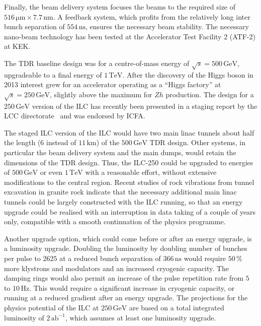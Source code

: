 \documentclass[%
 reprint,
 amsmath,amssymb,
 aps,
]{revtex4-1}
\begin{document}
Finally, the beam delivery system focuses the beams to the required size of $516\,{\mathrm{\mu m}} \times 7.7\,{\mathrm{nm}} $. 
A feedback system, which profits from the relatively long inter bunch separation of $554\,{\mathrm{ns}}$, ensures the necessary beam stability. 
The necessary nano-beam technology has been tested at the Accelerator Test Facility 2 (ATF-2) at KEK.


The TDR baseline design was for a centre-of-mass energy of $\sqrt{s}=500\,{\mathrm{GeV}}$, upgradeable to a final energy of $1\,{\mathrm{TeV}}$.
After the discovery of the Higgs boson in 2013 interest grew for an accelerator operating as a ``Higgs factory'' at $\sqrt{s}=250\,{\mathrm{GeV}}$, slightly above the maximum for $Zh$ production. 
The design for a $250\,{\mathrm{GeV}}$ version of the ILC has recently been presented in a  staging report by the LCC directorate~\cite{Evans:2017rvt} and was endorsed by ICFA.

The staged ILC version of the ILC  
would have two main linac tunnels about half the length ($6$ instead of $11\, {\mathrm{km}}$) of the $500\,{\mathrm{GeV}}$ TDR design. 
Other systems, in particular the beam delivery system and the main dumps, would retain the dimensions of the TDR design.
Thus, the ILC-250 could be upgraded to energies of $500\,{\mathrm{GeV}}$ or even $1\,{\mathrm{TeV}}$ with a reasonable effort, without extensive modifications to the central region. 
Recent studies of rock vibrations from tunnel excavation in granite rock indicate that the necessary additional main linac tunnels could be largely constructed with the ILC running, so that an energy upgrade could be realised with an interruption in data taking of a couple of years only, compatible with a smooth continuation of the physics programme.

Another upgrade option, which could come before or after an energy upgrade, is a luminosity upgrade. 
Doubling the luminosity by doubling number of bunches per pulse to $2625$ at a reduced bunch separation of $366\,{\mathrm{ns}}$ would require $50\,\%$ more klystrons and modulators and an increased cryogenic capacity. 
The damping rings would also permit an increase of the pulse repetition rate from $5$ to $10\,{\mathrm{Hz}}$. 
This would require a significant increase in cryogenic capacity, or running at a reduced gradient after an energy upgrade.
The projections for the physics potential of the ILC at $250\,{\mathrm{GeV}}$ are based on a total integrated luminosity of $2\,{\mathrm{ab}}^{-1}$, which assumes at least one luminosity upgrade.
\end{document}
